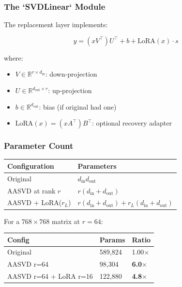 \subsubsection{The `SVDLinear` Module}

The replacement layer implements:

\[
y = (x V^\top) U^\top + b + \text{LoRA}(x) \cdot s
\tag{4.16}
\]

where:

\begin{itemize}
\item $V \in \mathbb{R}^{r \times d_\text{in}}$: down-projection
\item $U \in \mathbb{R}^{d_\text{out} \times r}$: up-projection
\item $b \in \mathbb{R}^{d_\text{out}}$: bias (if original had one)
\item $\text{LoRA}(x) = (x A^\top) B^\top$: optional recovery adapter

\end{itemize}
\subsubsection{Parameter Count}

\begin{table}[H]
\centering
\small
\begin{tabular}{ll}
\toprule
\textbf{Configuration} & \textbf{Parameters} \\
\midrule
Original & $d_\text{in} d_\text{out}$ \\
AASVD at rank $r$ & $r(d_\text{in} + d_\text{out})$ \\
AASVD + LoRA($r_L$) & $r(d_\text{in} + d_\text{out}) + r_L(d_\text{in} + d_\text{out})$ \\
\bottomrule
\end{tabular}
\end{table}

For a $768 \times 768$ matrix at $r = 64$:

\begin{table}[H]
\centering
\small
\begin{tabular}{lll}
\toprule
\textbf{Config} & \textbf{Params} & \textbf{Ratio} \\
\midrule
Original & 589,824 & 1.00$\times$ \\
AASVD r=64 & 98,304 & \textbf{6.0$\times$} \\
AASVD r=64 + LoRA r=16 & 122,880 & \textbf{4.8$\times$} \\
\bottomrule
\end{tabular}
\end{table}

